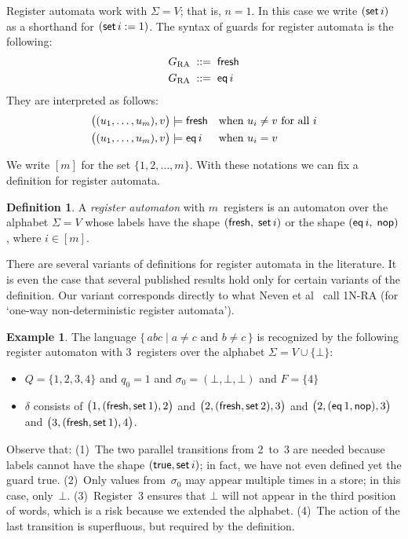 \documentclass[9pt, preprint]{sigplanconf} %
\theoremstyle{definition}
\newtheorem{definition}{Definition}
\newtheorem{example}{Example}
\theoremstyle{remark}
\begin{document}
Register automata work with $\Sigma=V$; that is, $n=1$.
In this case we write $({\sf set}\,i)$ as a shorthand for $({\sf set}\,i:=1)$.
The syntax of guards for register automata is the following:
\begin{align*}
G_{\rm RA} &\;::=\; {\sf fresh}\\
G_{\rm RA} &\;::=\; {\sf eq}\,i
\end{align*}
They are interpreted as follows:
\begin{align*}
\bigl((u_1,\ldots,u_m),v\bigr)&\models{\sf fresh}
  &&\text{when $u_i\ne v$ for all $i$} \\
\bigl((u_1,\ldots,u_m),v\bigr)&\models{\sf eq}\,i
  &&\text{when $u_i=v$}
\end{align*}

We write $[m]$ for the set $\{1,2,\ldots,m\}$.
With these notations we can fix a definition for register automata.

\begin{definition}
A \emph{register automaton} with $m$~registers is an automaton over the alphabet $\Sigma=V$ whose labels have the shape $({\sf fresh},\;{\sf set}\,i)$ or the shape $({\sf eq}\,i,\; {\sf nop})$, where $i\in[m]$.
\label{def:ra}
\end{definition}

There are several variants of definitions for register automata in the literature.
It is even the case that several published results hold only for certain variants of the definition.
Our variant corresponds directly to what Neven et al~\cite{dblp:conf/mfcs/nevensv01} call 1N-RA (for `one-way non-deterministic register automata').

\begin{example}\label{ex:ra1}
The language $\{\,abc\mid\text{$a\ne c$ and $b\ne c$}\,\}$ is recognized by the following register automaton with $3$~registers over the alphabet $\Sigma=V\cup\{\bot\}$:
\begin{itemize}
\item $Q=\{1,2,3,4\}$
  and $q_0=1$
  and $\sigma_0=(\bot,\bot,\bot)$
  and $F=\{4\}$
\item $\delta$ consists of
  $\bigl(1,({\sf fresh},{\sf set}\,1),2\bigr)$
  and $\bigl(2,({\sf fresh},{\sf set}\,2),3\bigr)$
  and $\bigl(2,({\sf eq}\,1,{\sf nop}),3\bigr)$
  and $\bigl(3,({\sf fresh},{\sf set}\,1),4\bigr)$.
\end{itemize}
Observe that:
(1)~The two parallel transitions from 2~to~3 are needed because labels cannot have the shape $({\sf true},{\sf set}\,i)$; in fact, we have not even defined yet the guard {\sf true}.
(2)~Only values from~$\sigma_0$ may appear multiple times in a store; in this case, only~$\bot$.
(3)~Register~3 ensures that $\bot$ will not appear in the third position of words, which is a risk because we extended the alphabet.
(4)~The action of the last transition is superfluous, but required by the definition.
\end{example}
\end{document}
